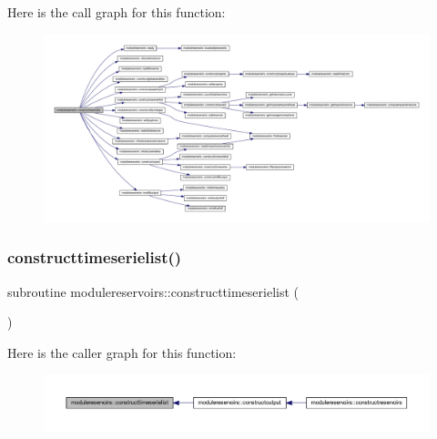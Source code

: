 Here is the call graph for this function\+:\nopagebreak
\begin{figure}[H]
\begin{center}
\leavevmode
\includegraphics[width=350pt]{namespacemodulereservoirs_a8356f95662b41d91816350cf3f3c6113_cgraph}
\end{center}
\end{figure}
\mbox{\label{namespacemodulereservoirs_a8922a19edc4b29fdfa9899431548dabc}} 
\subsubsection{\texorpdfstring{constructtimeserielist()}{constructtimeserielist()}}
{\footnotesize\ttfamily subroutine modulereservoirs\+::constructtimeserielist (\begin{DoxyParamCaption}{ }\end{DoxyParamCaption})\hspace{0.3cm}{\ttfamily [private]}}

Here is the caller graph for this function\+:\nopagebreak
\begin{figure}[H]
\begin{center}
\leavevmode
\includegraphics[width=350pt]{namespacemodulereservoirs_a8922a19edc4b29fdfa9899431548dabc_icgraph}
\end{center}
\end{figure}
\mbox{\label{namespacemodulereservoirs_a8cfdd387909b50145910c908f6e129f0}} 
